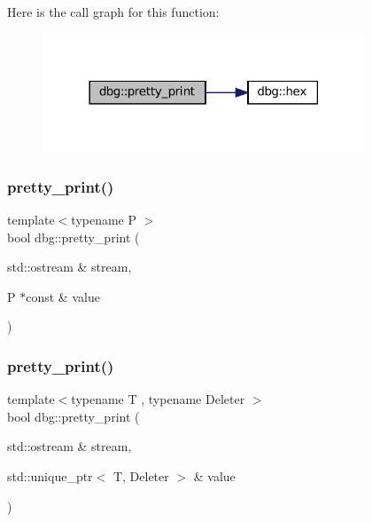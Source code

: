 Here is the call graph for this function\+:
\nopagebreak
\begin{figure}[H]
\begin{center}
\leavevmode
\includegraphics[width=273pt]{namespacedbg_acc6a678f0c3954671e247468e249e5a4_cgraph}
\end{center}
\end{figure}
\mbox{\label{namespacedbg_a2194ca6a2105fd8c57e5cb43f688d240}} 
\subsubsection{\texorpdfstring{pretty\+\_\+print()}{pretty\_print()}\hspace{0.1cm}{\footnotesize\ttfamily [6/19]}}
{\footnotesize\ttfamily template$<$typename P $>$ \\
bool dbg\+::pretty\+\_\+print (\begin{DoxyParamCaption}\item[{std\+::ostream \&}]{stream,  }\item[{P $\ast$const \&}]{value }\end{DoxyParamCaption})\hspace{0.3cm}{\ttfamily [inline]}}

\mbox{\label{namespacedbg_a6cbcb99c1fdd640925d80c390af3954a}} 
\subsubsection{\texorpdfstring{pretty\+\_\+print()}{pretty\_print()}\hspace{0.1cm}{\footnotesize\ttfamily [7/19]}}
{\footnotesize\ttfamily template$<$typename T , typename Deleter $>$ \\
bool dbg\+::pretty\+\_\+print (\begin{DoxyParamCaption}\item[{std\+::ostream \&}]{stream,  }\item[{std\+::unique\+\_\+ptr$<$ T, Deleter $>$ \&}]{value }\end{DoxyParamCaption})\hspace{0.3cm}{\ttfamily [inline]}}

